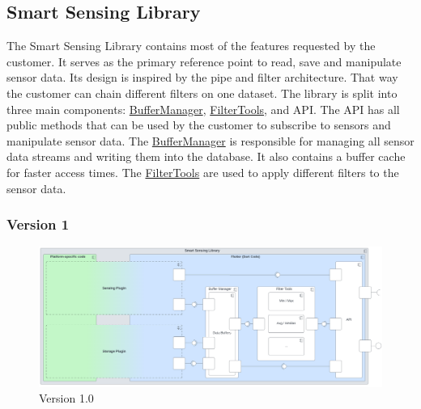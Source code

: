 \documentclass[12pt]{article}
\begin{document}
\subsection{Smart Sensing Library}
\label{sec:SmartSensingLibrary}
The Smart Sensing Library contains most of the features requested by the customer. It serves as the primary reference point to read, save and manipulate sensor data. Its design is inspired by the pipe and filter architecture. That way the customer can chain different filters on one dataset. The library is split into three main components: \hyperref[sec:BufferManager]{BufferManager}, \hyperref[sec:FilterTools]{FilterTools}, and API. The API has all public methods that can be used by the customer to subscribe to sensors and manipulate sensor data. The \hyperref[sec:BufferManager]{BufferManager} is responsible for managing all sensor data streams and writing them into the database. It also contains a buffer cache for faster access times. The \hyperref[sec:FilterTools]{FilterTools} are used to apply different filters to the sensor data.

\subsubsection{Version 1}
\begin{figure}[ht]
\includegraphics[width=1\textwidth]{Graphics/SmartSensingLibraryOld.png}
\caption{\label{fig:bild1}Version 1.0}
\end{figure}
\end{document}
